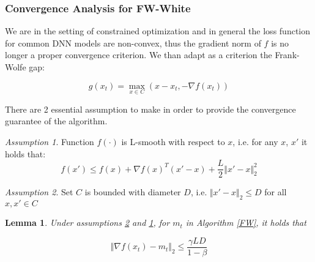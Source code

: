\documentclass[10pt,twocolumn,letterpaper, english]{article}
\theoremstyle{definition}
\theoremstyle{plain}
\theoremstyle{plain}
\newtheorem{lemma}{Lemma}[subsection]
\theoremstyle{plain}
\theoremstyle{plain}
\theoremstyle{remark}
\theoremstyle{remark}
\newtheorem{ass}{Assumption}[subsection]
\theoremstyle{definition}
\theoremstyle{definition}
\theoremstyle{definition}
\theoremstyle{definition}
\begin{document}
\subsubsection{Convergence Analysis for FW-White}

We are in the setting of constrained optimization and in general the loss function for common DNN models are non-convex, thus the gradient norm of $f$ is no longer a proper convergence criterion. We than adapt as a criterion the Frank-Wolfe gap:

\begin{equation} \label{gap}
    g(x_t)= \max_{x \in C} ( x-x_t, - \nabla f(x_t))
\end{equation}

There are 2 essential assumption to make in order to provide the convergence guarantee of the algorithm.

\begin{ass}\label{ass1}
Function $f(\cdot)$ is L-smooth with respect to $x$, i.e. for any $x$, $x'$ it holds that:
\begin{equation*}
    f(x') \le f(x) + \nabla f(x)^T (x' - x) + \frac{L}{2} \Vert x' -x \Vert_{2}^2
\end{equation*}
\end{ass}




\begin{ass}\label{ass2}
Set $C$ is bounded with diameter $D$, i.e. $\Vert x' -x \Vert_{2} \le D$ for all $x, x' \in C$

\end{ass}

\begin{lemma}
Under assumptions \ref{ass2} and \ref{ass1}, for $m_t$ in Algorithm \ref{FW}, it holds that

\begin{equation*}
    \Vert \nabla f(x_t) - m_t \Vert_{2} \le \frac{\gamma LD}{ 1 - \beta}
\end{equation*}
\end{lemma}
\end{document}
